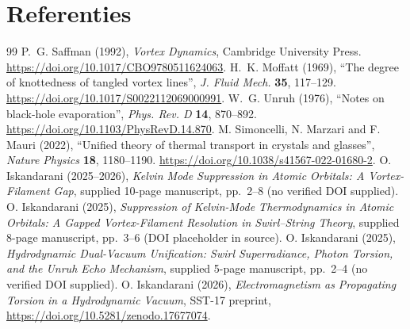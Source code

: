 \documentclass[10pt,a4paper]{article}
\begin{document}
\section*{Referenties}
\begin{thebibliography}{99}
 P.~G. Saffman (1992), \emph{Vortex Dynamics}, Cambridge University Press. \url{https://doi.org/10.1017/CBO9780511624063}.
 H.~K. Moffatt (1969), ``The degree of knottedness of tangled vortex lines'', \emph{J. Fluid Mech.} \textbf{35}, 117--129. \url{https://doi.org/10.1017/S0022112069000991}.
 W.~G. Unruh (1976), ``Notes on black-hole evaporation'', \emph{Phys. Rev. D} \textbf{14}, 870--892. \url{https://doi.org/10.1103/PhysRevD.14.870}.
 M. Simoncelli, N. Marzari and F. Mauri (2022), ``Unified theory of thermal transport in crystals and glasses'', \emph{Nature Physics} \textbf{18}, 1180--1190. \url{https://doi.org/10.1038/s41567-022-01680-2}.
 O. Iskandarani (2025--2026), \emph{Kelvin Mode Suppression in Atomic Orbitals: A Vortex-Filament Gap}, supplied 10-page manuscript, pp.~2--8 (no verified DOI supplied).
 O. Iskandarani (2025), \emph{Suppression of Kelvin-Mode Thermodynamics in Atomic Orbitals: A Gapped Vortex-Filament Resolution in Swirl--String Theory}, supplied 8-page manuscript, pp.~3--6 (DOI placeholder in source).
 O. Iskandarani (2025), \emph{Hydrodynamic Dual-Vacuum Unification: Swirl Superradiance, Photon Torsion, and the Unruh Echo Mechanism}, supplied 5-page manuscript, pp.~2--4 (no verified DOI supplied).
 O. Iskandarani (2026), \emph{Electromagnetism as Propagating Torsion in a Hydrodynamic Vacuum}, SST-17 preprint, \url{https://doi.org/10.5281/zenodo.17677074}.
\end{thebibliography}
\end{document}
